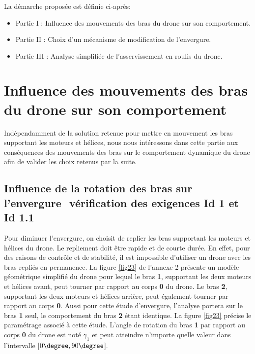 La démarche proposée est définie ci-après:
\begin{itemize}
 \item Partie I :­ Influence des mouvements des bras du drone sur son comportement.
 \item Partie II :­ Choix d'un mécanisme de modification de l'envergure.
­ \item Partie III :­ Analyse simplifiée de l'asservissement en roulis du drone.
\end{itemize}

\newpage

\section{Influence des mouvements des bras du drone sur son
comportement}

Indépendamment de la solution retenue pour mettre en mouvement les bras supportant les moteurs et hélices, nous nous intéressons dans cette partie aux conséquences des mouvements des bras sur le comportement dynamique du drone afin de valider les choix retenus par la suite.

\vspace{-0.5cm}

\subsection{Influence de la rotation des bras sur l'envergure ­ vérification des exigences Id 1 et Id 1.1}

Pour diminuer l'envergure, on choisit de replier les bras supportant les moteurs et hélices du drone. Le repliement doit être rapide et de courte durée. En effet, pour des raisons de contrôle et de stabilité, il est impossible d'utiliser un drone avec les bras repliés en permanence. La figure \ref{fig23} de l'annexe 2 présente un modèle géométrique simplifié du drone pour lequel le
bras \textbf{1}, supportant les deux moteurs et hélices avant, peut tourner par rapport au corps \textbf{0} du drone. Le bras \textbf{2}, supportant les deux moteurs et hélices arrière, peut également tourner par rapport au corps \textbf{0}. Aussi pour cette étude d'envergure, l'analyse portera sur le bras \textbf{1} seul, le comportement du bras \textbf{2} étant identique. La figure \ref{fig23} précise le paramétrage associé à cette étude. L'angle de rotation du bras \textbf{1} par rapport au corps \textbf{0} du drone est noté $\gamma_1$ et peut atteindre n'importe quelle valeur dans l'intervalle [$0\degree, 90\degree$].

